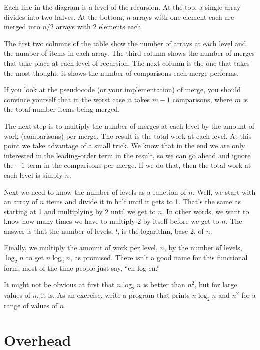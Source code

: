  
Each line in the diagram is a level of the recursion.  At the
top, a single array divides into two halves.  At the bottom, $n$
arrays with one element each are merged into $n/2$ arrays with
2 elements each.


The first two columns of the table show the number of arrays at each
level and the number of items in each array.  The third column shows
the number of merges that take place at each level of recursion.  The
next column is the one that takes the most thought: it shows the
number of comparisons each merge performs.


If you look at the pseudocode (or your implementation) of
merge, you should convince yourself that in the worst case it
takes $m-1$ comparisons, where $m$ is the total number items
being merged.

The next step is to multiply the number of merges at each level
by the amount of work (comparisons) per merge.  The result is the
total work at each level.  At this point we take advantage of a small
trick.  We know that in the end we are only interested in the
leading-order term in the result, so we can go ahead
and ignore the $-1$ term in the comparisons per merge.  If we do
that, then the total work at each level is simply $n$.

Next we need to know the number of levels as a function of $n$.  Well,
we start with an array of $n$ items and divide it in half until it
gets to 1.  That's the same as starting at 1 and multiplying by 2
until we get to $n$.  In other words, we want to know how many times
we have to multiply 2 by itself before we get to $n$.  The answer is
that the number of levels, $l$, is the logarithm, base 2, of $n$.

Finally, we multiply the amount of work per level, $n$, by the
number of levels, $\log_2 n$ to get $n \log_2 n$, as promised.
There isn't a good name for this functional form; most of the
time people just say, ``en log en.''

It might not be obvious at first that $n \log_2 n$ is better than
$n^2$, but for large values of $n$, it is.
As an exercise, write a program that prints $n \log_2 n$ and
$n^2$ for a range of values of $n$.


\section{Overhead}

